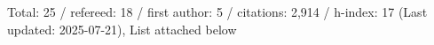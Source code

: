 Total: 25 / refereed: 18 / first author: 5 / citations: 2,914 / h-index: 17 (Last updated: 2025-07-21), List attached below